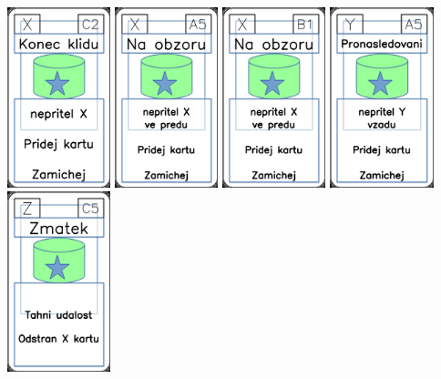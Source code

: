 \documentclass[a4paper]{article}
\begin{document}
	\includegraphics[width=3.0cm]{img-5_11}
	\includegraphics[width=3.0cm]{img-5_4}
	\includegraphics[width=3.0cm]{img-5_5}
	\includegraphics[width=3.0cm]{img-5_34}
	\includegraphics[width=3.0cm]{img-5_44}
\end{document}
